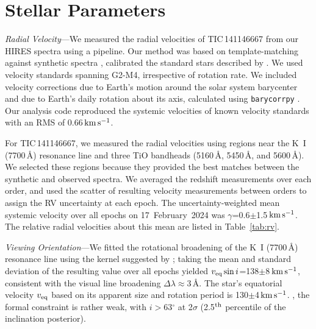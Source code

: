 \documentclass[11pt,twocolumn,tighten]{aastex7}
\newcommand{\kms}{\ensuremath{\rm km\,s^{-1}}}
\begin{document}
\appendix

\section{Stellar Parameters}
\label{sec:stparams}

{\it Radial Velocity}---We measured the radial velocities of
TIC\,141146667 from our HIRES
spectra using a pipeline.  Our method was based on
template-matching against synthetic spectra
\citep{Husser2013}, calibrated the
standard stars described by \citet{Chubak2012}.  We used velocity
standards spanning G2-M4, irrespective of rotation rate.  We included
velocity corrections due to Earth's motion around the solar system
barycenter and due to Earth's daily rotation about its axis,
calculated using \texttt{barycorrpy} \citep{Kanodia2018}.  Our
analysis code reproduced the systemic velocities of known velocity
standards \citep{Chubak2012} with an RMS of 0.66\,\kms.

For TIC\,141146667, we measured the radial velocities using regions
near the K~I (7700\,\AA) resonance line and three TiO bandheads
(5160\,\AA, 5450\,\AA, and 5600\,\AA).  We selected these regions
because they provided the best matches between the synthetic and
observed spectra.  We averaged the redshift measurements over each
order, and used the scatter of resulting velocity measurements between
orders to assign the RV uncertainty at each epoch.  The
uncertainty-weighted mean systemic velocity over all epochs on
17~February~2024 was $\gamma$=0.6$\pm$1.5\,\kms.  The relative radial
velocities about this mean are listed in Table~\ref{tab:rv}.

{\it Viewing Orientation}---We fitted the rotational broadening of the
K~I (7700\,\AA) resonance line using the kernel suggested by
\citet{Gray2008}; taking the mean and standard deviation of the
resulting value over all epochs yielded $v_{\rm eq} \sin
i$=138$\pm$8\,\kms, consistent with the visual line broadening $\Delta
\lambda$$\approx$3\,\AA.  The star's equatorial velocity $v_{\rm eq}$
based on its apparent size and rotation period is 130$\pm$4\,\kms.
, the formal constraint is rather weak, with $i$$>$63$^\circ$
at 2$\sigma$ (2.5$^{\rm th}$ percentile of the inclination posterior).

\end{document}
